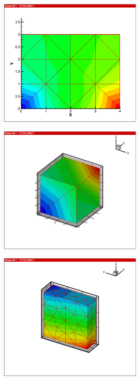 {\begin{figure}[htb!]
  \includegraphics[width=7cm]{figures/h_tri.eps}\\
\end{figure}

\begin{figure}[htb!]
  \includegraphics[width=7cm]{figures/h_tet1.eps}\\
\end{figure}

\begin{figure}[htb!]
  \includegraphics[width=7cm]{figures/h_tet2.eps}\\
\end{figure}

}
